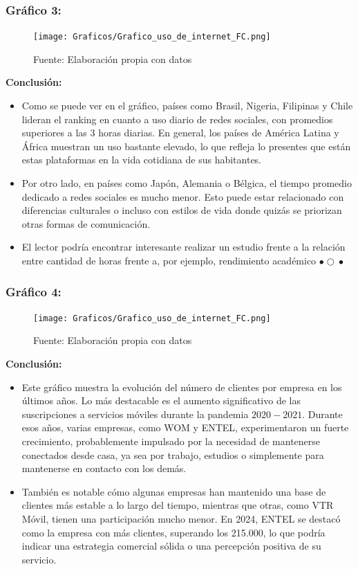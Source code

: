 \documentclass[12pt, a4paper]{article}
\begin{document}
\subsubsection*{Gráfico 3: }
\begin{figure}[H]
    \centering
    \texttt{[image: Graficos/Grafico\_uso\_de\_internet\_FC.png]}
    \caption[3]{Fuente: Elaboración propia con datos}
\end{figure}

\newpage
\textbf{Conclusión:}  
\begin{itemize}
    \item Como se puede ver en el gráfico, países como Brasil, Nigeria, Filipinas y Chile lideran el ranking en cuanto a uso diario de redes sociales, con promedios superiores a las 3 horas diarias. En general, los países de América Latina y África muestran un uso bastante elevado, lo que refleja lo presentes que están estas plataformas en la vida cotidiana de sus habitantes.
    \item Por otro lado, en países como Japón, Alemania o Bélgica, el tiempo promedio dedicado a redes sociales es mucho menor. Esto puede estar relacionado con diferencias culturales o incluso con estilos de vida donde quizás se priorizan otras formas de comunicación.
    \item El lector podría encontrar interesante realizar un estudio frente a la relación entre cantidad de horas frente a, por ejemplo, rendimiento académico $\bullet{}\bigcirc{}\bullet{}$
\end{itemize}

\subsubsection*{Gráfico 4: }
\begin{figure}[H]
    \centering
    \texttt{[image: Graficos/Grafico\_uso\_de\_internet\_FC.png]}
    \caption[4]{Fuente: Elaboración propia con datos}

\end{figure}


\textbf{Conclusión:}  
\begin{itemize}
    \item Este gráfico muestra la evolución del número de clientes por empresa en los últimos años. Lo más destacable es el aumento significativo de las suscripciones a servicios móviles durante la pandemia \(2020-2021\).
    Durante esos años, varias empresas, como WOM y ENTEL, experimentaron un fuerte crecimiento, probablemente impulsado por la necesidad de mantenerse conectados desde casa, ya sea por trabajo, estudios o simplemente para mantenerse en contacto con los demás.
    \item También es notable cómo algunas empresas han mantenido una base de clientes más estable a lo largo del tiempo, mientras que otras, como VTR Móvil, tienen una participación mucho menor. En 2024, ENTEL se destacó como la empresa con más clientes, superando los 215.000, lo que podría indicar una estrategia comercial sólida o una percepción positiva de su servicio.

\end{itemize}
\end{document}
